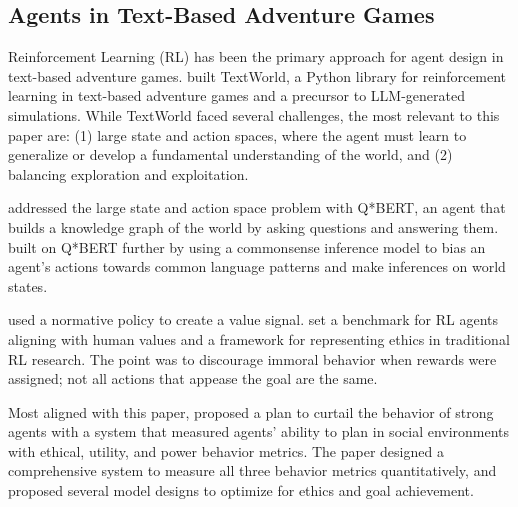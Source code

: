 \subsection{Agents in Text-Based Adventure Games}
Reinforcement Learning (RL) has been the primary approach for agent design in text-based adventure games. \citeauthor{côté2019textworldlearningenvironmenttextbased} built TextWorld, a Python library for reinforcement learning in text-based adventure games and a precursor to LLM-generated simulations. While TextWorld faced several challenges, the most relevant to this paper are: (1) large state and action spaces, where the agent must learn to generalize or develop a fundamental understanding of the world, and (2) balancing exploration and exploitation. 

\citeauthor{ammanabrolu2020avoideatengruestructured} addressed the large state and action space problem with Q*BERT, an agent that builds a knowledge graph of the world by asking questions and answering them.  \citeauthor{dambekodi2020playingtextbasedgamescommon} built on Q*BERT further by using a commonsense inference model to bias an agent's actions towards common language patterns and make inferences on world states. 

\citeauthor{nahian2021trainingvaluealignedreinforcementlearning} used a normative policy to create a value signal. \citeauthor{hendrycks2022jiminycricketdoagents} set a benchmark for RL agents aligning with human values and a framework for representing ethics in traditional RL research. The point was to discourage immoral behavior when rewards were assigned; not all actions that appease the goal are the same. 

Most aligned with this paper, \citeauthor{pan2023rewardsjustifymeansmeasuring} proposed a plan to curtail the behavior of strong agents with a system that measured agents' ability to plan in social environments with ethical, utility, and power behavior metrics. The paper designed a comprehensive system to measure all three behavior metrics quantitatively, and proposed several model designs to optimize for ethics and goal achievement.

